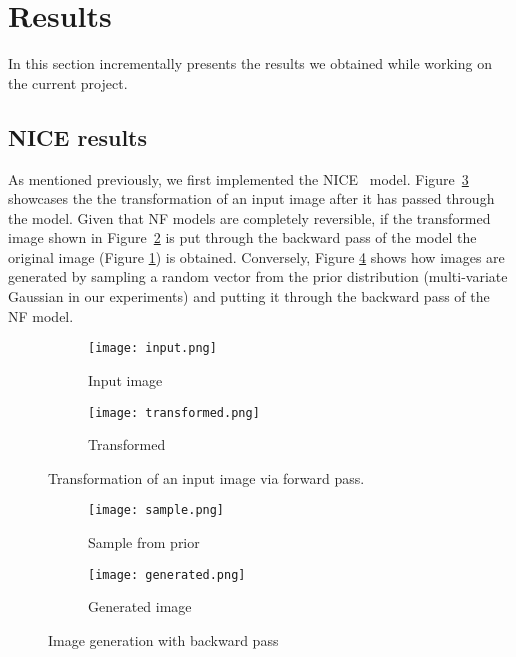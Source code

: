 \section{Results}
In this section incrementally presents the results we obtained while working on the current project.
\subsection{NICE results}
As mentioned previously, we first implemented the NICE~\cite{nice} model. Figure~\ref{fig:forward_pass} showcases the the transformation of an input image after it has passed through the model. Given that NF models are completely reversible, if the transformed image shown in Figure~\ref{fig:transformed} is put through the backward pass of the model the original image (Figure \ref{fig:original}) is obtained.  Conversely, Figure \ref{fig:backward_pass} shows how images are generated by sampling a random vector from the prior distribution (multi-variate Gaussian in our experiments) and putting it through the backward pass of the NF model.
    \begin{figure}[htbp!]
     \centering
     \begin{subfigure}[b]{0.45\textwidth}
         \centering
         \texttt{[image: input.png]}
         \caption{Input image}
         \label{fig:original}
     \end{subfigure} 
     \hfill
     \begin{subfigure}[b]{0.45\textwidth}
         \centering
         \texttt{[image: transformed.png]}
         \caption{Transformed}
         \label{fig:transformed}
     \end{subfigure}
     \hfill
     \caption{Transformation of an input image via forward pass.}
     \label{fig:forward_pass}
\end{figure}

    \begin{figure}[htbp!]
     \centering
     \begin{subfigure}[b]{0.45\textwidth}
         \centering
         \texttt{[image: sample.png]}
         \caption{Sample from prior}
     \end{subfigure} 
     \hfill
     \begin{subfigure}[b]{0.45\textwidth}
         \centering
         \texttt{[image: generated.png]}
         \caption{Generated image}
     \end{subfigure}
     \hfill
     \caption{Image generation with backward pass}
     \label{fig:backward_pass}
\end{figure}

